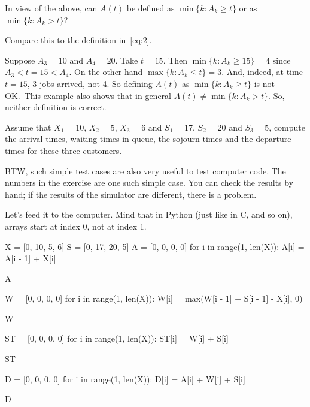 \begin{exercise}\label{ex:22}
 In  view of the above, can $A(t)$ be defined as $\min\{k : A_k \geq t\}$ or as $\min\{k: A_k > t\}$?
\begin{hint}
Compare this to the definition in~\cref{eq:2}.
\end{hint}
\begin{solution}
  Suppose $A_3 = 10$ and $A_4 = 20$.
  Take $t=15$.
  Then $\min\{k : A_k \geq 15\} = 4$ since $A_3 < t=15 < A_4$.
  On the other hand $\max\{k : A_k \leq t\} = 3$.
  And, indeed, at time $t=15$, 3 jobs arrived, not 4.
  So defining $A(t)$ as $\min\{k : A_k \geq t\}$ is not OK.\
  This example also shows that in general $A(t) \neq \min\{k : A_k > t\}$.
  So, neither definition is correct.
\end{solution}
\end{exercise}



\begin{exercise}\label{ex:82}
 Assume  that $X_1=10$, $X_2=5$, $X_3=6$ and $S_1 = 17$, $S_2=20$ and $S_3=5$, compute the arrival times, waiting times in queue, the sojourn times and the departure times for these three customers.
\begin{hint}

 BTW, such simple test cases are also very useful to test computer code.
 The numbers in the exercise are one such simple case.
 You can check the results by hand; if the results of the simulator are different, there is a problem.
\end{hint}
\begin{solution} Let's feed it to the computer. Mind that in Python (just like in C, and so on), arrays start at index 0, not at index 1.
\begin{pyconsole}
X = [0, 10, 5, 6]
S = [0, 17, 20, 5]
A = [0, 0, 0, 0]
for i in range(1, len(X)):
    A[i] = A[i - 1] + X[i]

A

W = [0, 0, 0, 0]
for i in range(1, len(X)):
    W[i] = max(W[i - 1] + S[i - 1] - X[i], 0)

W

ST = [0, 0, 0, 0]
for i in range(1, len(X)):
    ST[i] = W[i] + S[i]

ST

D = [0, 0, 0, 0]
for i in range(1, len(X)):
    D[i] = A[i] + W[i] + S[i]

D
\end{pyconsole}

\end{solution}
\end{exercise}



